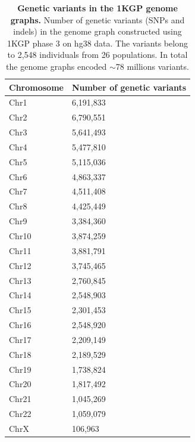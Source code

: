 \documentclass[a4paper, titlepage, openright]{book}
\begin{document}
\begin{table}
    \centering
    \begin{tabular}{|p{4cm}|p{6cm}|}
        \hline
        \textbf{Chromosome} & \textbf{Number of genetic variants} \\
        \hline
        Chr1 & 6,191,833\\
        \hline
        Chr2 & 6,790,551\\
        \hline
        Chr3 & 5,641,493\\
        \hline
        Chr4 & 5,477,810\\
        \hline
        Chr5 & 5,115,036\\
        \hline
        Chr6 & 4,863,337\\
        \hline
        Chr7 & 4,511,408\\
        \hline
        Chr8 & 4,425,449\\
        \hline
        Chr9 & 3,384,360\\
        \hline
        Chr10 & 3,874,259\\
        \hline
        Chr11 & 3,881,791\\
        \hline
        Chr12 & 3,745,465\\
        \hline
        Chr13 & 2,760,845\\
        \hline
        Chr14 & 2,548,903\\
        \hline
        Chr15 & 2,301,453\\
        \hline
        Chr16 & 2,548,920\\
        \hline
        Chr17 & 2,209,149\\
        \hline
        Chr18 & 2,189,529\\
        \hline
        Chr19 & 1,738,824\\
        \hline
        Chr20 & 1,817,492\\
        \hline
        Chr21 & 1,045,269\\
        \hline
        Chr22 & 1,059,079\\
        \hline
        ChrX & 106,963\\
        \hline
    \end{tabular}
    \caption[Genetic variants in the 1KGP genome graphs]{\textbf{Genetic variants in the 1KGP genome graphs.} Number of genetic variants (SNPs and indels) in the genome graph constructed using 1KGP phase 3 on hg38 data. The variants belong to 2,548 individuals from 26 populations. In total the genome graphs encoded $\sim$78 millions variants.}
    \label{table-1KGP-variants}
\end{table}
\end{document}
